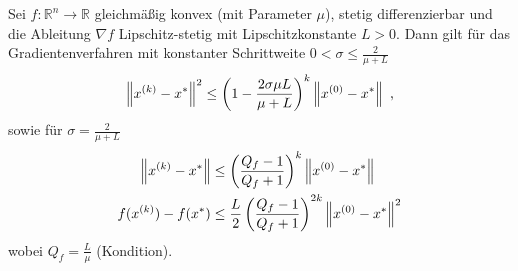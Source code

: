 \begin{Satz}
\label{thm:konvergenz_grad_verfahren_glchm_konvex}
  Sei $f: \mathbb{R}^n \rightarrow \mathbb{R}$ gleichmäßig konvex (mit Parameter $\mu$), stetig differenzierbar und die Ableitung $\nabla f$ Lipschitz-stetig mit Lipschitzkonstante $L>0$. Dann gilt für das Gradientenverfahren mit konstanter Schrittweite $0<\sigma\leq\frac{2}{\mu + L}$
  \begin{equation*}
    \left\lVert x^{(k)}-x^\ast\right\rVert^2 \leq \left( 1 - \frac{2\sigma \mu L}{\mu + L}\right)^k \left\lVert x^{(0)}-x^\ast\right\rVert \text{ ,}
  \end{equation*}
  sowie für $\sigma = \frac{2}{\mu + L}$
  \begin{gather*}
          \begin{aligned}
            \left\lVert x^{(k)}-x^\ast\right\rVert & \leq \left(\frac{Q_f-1}{Q_f+1}\right)^k \left\lVert x^{(0)}-x^\ast\right\rVert \\
            f(x^{(k)}) - f(x^ \ast)& \leq \frac{L}{2}\left(\frac{Q_f-1}{Q_f+1}\right)^{2k} \left\lVert x^{(0)}-x^\ast\right\rVert^2 \\
          \end{aligned}
    \end{gather*}
    wobei $Q_f = \frac{L}{\mu}$ (Kondition).
\end{Satz}
